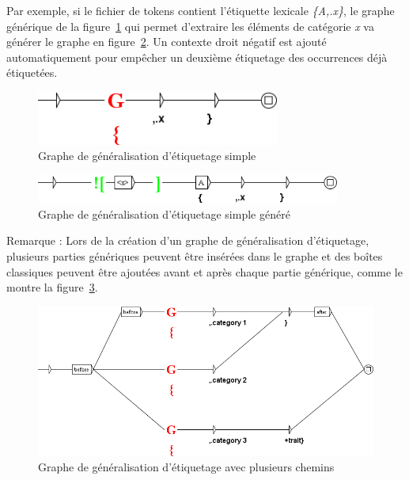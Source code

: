 \bigskip
Par exemple, si le fichier de tokens contient l'étiquette lexicale \emph{\{A,.x\}}, le graphe générique de la figure~\ref{fig:graphe_generique_simple} qui permet d'extraire les éléments de catégorie \textit{x} va générer le graphe en figure~\ref{fig:graphe_generique_simple_genere}. Un contexte droit négatif est ajouté automatiquement pour empêcher un deuxième étiquetage des occurrences déjà étiquetées.

\begin{figure}[!htb]
  \centering
  \includegraphics[width=8cm]{resources/img/graphe_generique_simple.png}
  \caption{Graphe de généralisation d'étiquetage simple}
  \label{fig:graphe_generique_simple}
\end{figure}

\begin{figure}[!htb]
  \centering
  \includegraphics[width=10cm]{resources/img/graphe_generique_simple_genere.png}
  \caption{Graphe de généralisation d'étiquetage simple généré}
  \label{fig:graphe_generique_simple_genere}
\end{figure}

\bigskip
Remarque : Lors de la création d'un graphe de généralisation d'étiquetage, plusieurs parties génériques peuvent être insérées dans le graphe et des boîtes classiques peuvent être ajoutées avant et après chaque partie générique, comme le montre la figure~\ref{fig:graphe_generique_plusieurs_chemins}.

\begin{figure}[!htb]
  \centering
  \includegraphics[width=14cm]{resources/img/graphe_generique_plusieurs_chemins.png}
  \caption{Graphe de généralisation d'étiquetage avec plusieurs chemins}
  \label{fig:graphe_generique_plusieurs_chemins}
\end{figure}

